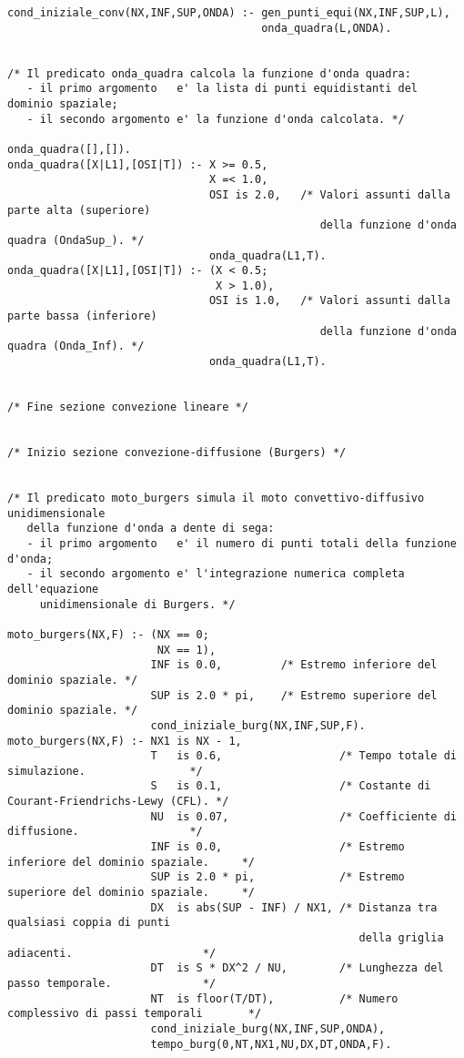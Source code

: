 \begin{verbatim}
cond_iniziale_conv(NX,INF,SUP,ONDA) :- gen_punti_equi(NX,INF,SUP,L),
                                       onda_quadra(L,ONDA).


/* Il predicato onda_quadra calcola la funzione d'onda quadra:
   - il primo argomento   e' la lista di punti equidistanti del dominio spaziale;
   - il secondo argomento e' la funzione d'onda calcolata. */

onda_quadra([],[]).
onda_quadra([X|L1],[OSI|T]) :- X >= 0.5,
                               X =< 1.0,
                               OSI is 2.0,   /* Valori assunti dalla parte alta (superiore) 
                                                della funzione d'onda quadra (OndaSup_). */
                               onda_quadra(L1,T).
onda_quadra([X|L1],[OSI|T]) :- (X < 0.5; 
                                X > 1.0),
                               OSI is 1.0,   /* Valori assunti dalla parte bassa (inferiore) 
                                                della funzione d'onda quadra (Onda_Inf). */
                               onda_quadra(L1,T).


/* Fine sezione convezione lineare */


/* Inizio sezione convezione-diffusione (Burgers) */


/* Il predicato moto_burgers simula il moto convettivo-diffusivo unidimensionale
   della funzione d'onda a dente di sega:
   - il primo argomento   e' il numero di punti totali della funzione d'onda;
   - il secondo argomento e' l'integrazione numerica completa dell'equazione 
     unidimensionale di Burgers. */

moto_burgers(NX,F) :- (NX == 0;
                       NX == 1),
                      INF is 0.0,         /* Estremo inferiore del dominio spaziale. */
                      SUP is 2.0 * pi,    /* Estremo superiore del dominio spaziale. */
                      cond_iniziale_burg(NX,INF,SUP,F).
moto_burgers(NX,F) :- NX1 is NX - 1,
                      T   is 0.6,                  /* Tempo totale di simulazione.                */
                      S   is 0.1,                  /* Costante di Courant-Friendrichs-Lewy (CFL). */
                      NU  is 0.07,                 /* Coefficiente di diffusione.                 */
                      INF is 0.0,                  /* Estremo inferiore del dominio spaziale.     */
                      SUP is 2.0 * pi,             /* Estremo superiore del dominio spaziale.     */
                      DX  is abs(SUP - INF) / NX1, /* Distanza tra qualsiasi coppia di punti
                                                      della griglia adiacenti.                    */
                      DT  is S * DX^2 / NU,        /* Lunghezza del passo temporale.              */
                      NT  is floor(T/DT),          /* Numero complessivo di passi temporali       */
                      cond_iniziale_burg(NX,INF,SUP,ONDA),
                      tempo_burg(0,NT,NX1,NU,DX,DT,ONDA,F).



\end{verbatim}
